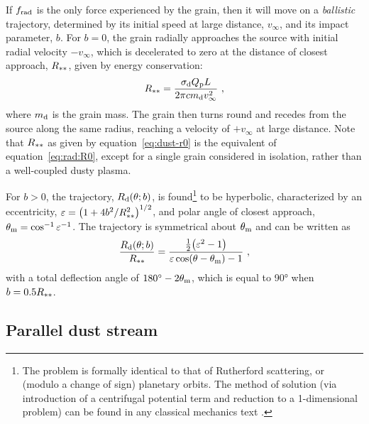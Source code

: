 If \(f_{\text{rad}}\) is the only force experienced by the grain, then it will
move on a \textit{ballistic} trajectory, determined by its initial
speed at large distance, \(v_\infty\), and its impact parameter, \(b\).
For \(b = 0\), the grain radially approaches the source with initial
radial velocity \(-v_\infty\), which is decelerated to zero at the distance
of closest approach, \(R_{**}\), given by energy conservation:
\begin{equation}
  \label{eq:dust-r0}
  R\starstar = \frac{\xsec \Qp L} {2 \pi c m\grain v_\infty^2} \ ,
\end{equation}
where \(m_{\text{d}}\) is the grain mass.  The grain then turns round and
recedes from the source along the same radius, reaching a velocity of
\(+v_\infty\) at large distance.  Note that \(R_{**}\) as given by
equation~\eqref{eq:dust-r0} is the equivalent of
equation~\eqref{eq:rad:R0}, except for a single grain considered in
isolation, rather than a well-coupled dusty plasma.

For \(b > 0\), the trajectory, \(R_{\text{d}}(\theta; b)\), is
found\footnote{%
  The problem is formally identical to that of Rutherford scattering,
  or (modulo a change of sign) planetary orbits.  The method of
  solution (via introduction of a centrifugal potential term and
  reduction to a 1-dimensional problem) can be found in any classical
  mechanics text \citep[e.g.,][\S~14]{Landau:1976a}.} %
to be hyperbolic, characterized by an eccentricity,
\(\varepsilon = \bigl( 1 + 4 b^2 / R_{**}^2\bigr)^{1/2}\), and polar angle
of closest approach, \(\theta_{\text{m}} = \cos^{-1} \varepsilon^{-1}\).  The trajectory is
symmetrical about \(\theta_{\text{m}}\) and can be written as
\begin{equation}
  \label{eq:dust-r-theta}
  \frac{R_{\text{d}}(\theta; b)} {R_{**}} = 
  \frac{ \tfrac12 \bigl( \varepsilon^2 - 1 \bigr)} {\varepsilon \cos(\theta - \theta_{\text{m}}) - 1} \ , 
\end{equation}
with a total deflection angle of \(\ang{180} - 2 \theta_{\text{m}}\), which is equal to
\ang{90} when \(b = 0.5 R_{**}\).

\subsection{Parallel dust stream}
\label{sec:dust-parallel}

